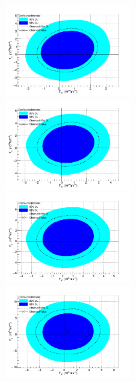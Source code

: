 \begin{figure}[htp]
\centering
\includegraphics[width=0.495\textwidth]{figures/aQGC/lll-Un-Unit.png}
\includegraphics[width=0.495\textwidth]{figures/aQGC/lll-3000.png}
\includegraphics[width=0.495\textwidth]{figures/aQGC/lll-2000.png}
\includegraphics[width=0.495\textwidth]{figures/aQGC/lll-1000.png}

\end{figure}
